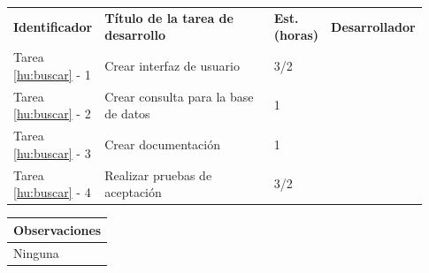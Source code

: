 \documentclass[11pt]{article}
\begin{document}
\begin{longtable}{p{0.18\linewidth}|p{0.48\linewidth}|p{0.1\linewidth}|p{0.17\linewidth}}
  \toprule
  \textbf{Identificador} & \textbf{Título de la tarea de desarrollo} & \textbf{Est. (horas)} & \textbf{Desarrollador} \\
  Tarea \ref{hu:buscar} - 1 & Crear interfaz de usuario & 3/2 &\\
  Tarea \ref{hu:buscar} - 2 & Crear consulta para la base de datos & 1 & \\
  Tarea \ref{hu:buscar} - 3 & Crear documentación & 1 & \\
  Tarea \ref{hu:buscar} - 4 & Realizar pruebas de aceptación & 3/2 &  \\
  \bottomrule
\end{longtable}
\vspace{-0.8cm}
\begin{longtable}{p{1.028\linewidth}}
  \textbf{Observaciones}\\
  \midrule
  Ninguna\\
  \bottomrule
\end{longtable}
\end{document}

